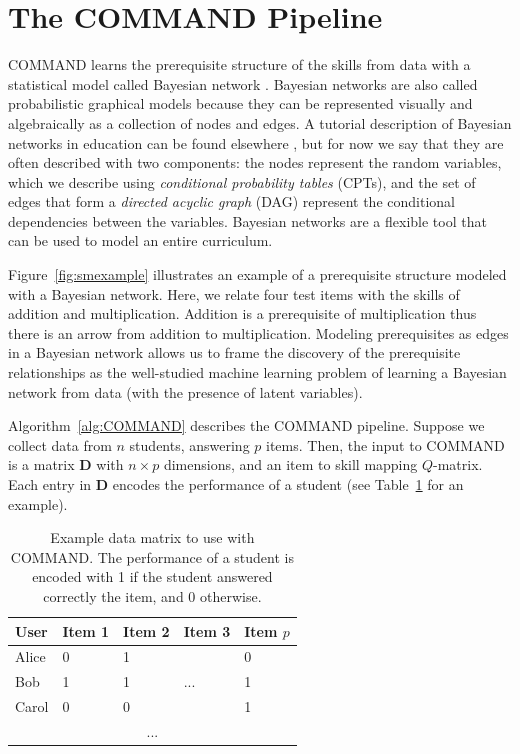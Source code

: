 \documentclass{edm_template}
\begin{document}
\section{The COMMAND Pipeline}
\label{sec:pre_pipeline}
COMMAND learns the prerequisite structure of the skills from data with a statistical model called Bayesian network \cite{pearl2000causality,spirtes2001causation}.
Bayesian networks are also called probabilistic graphical models  because they can  be represented visually and algebraically as a collection of nodes and edges.
A tutorial description of Bayesian networks in education can be found elsewhere \cite{almond2015bayesian}, 
but for now we say that they are often described with two components: 
the  nodes represent the random variables, which we describe using \textit{conditional probability tables} (CPTs),
and the set of edges that form a \textit{directed acyclic graph} (DAG) represent the conditional dependencies between the variables.
Bayesian networks are a flexible tool that can be used to model an entire curriculum.

Figure~\ref{fig:smexample} illustrates an example of a prerequisite structure modeled with a Bayesian network.
Here, we relate four test items with the skills of addition and multiplication.
Addition is a prerequisite of multiplication thus there is an arrow from addition to multiplication.
Modeling prerequisites as edges in a Bayesian network allows us to frame the discovery of the prerequisite relationships as the well-studied machine learning problem of
learning a Bayesian network from data (with the presence of latent variables).


Algorithm~\ref{alg:COMMAND} describes the COMMAND pipeline.
Suppose we collect data from  $n$ students, answering $p$ items.
Then, the input to COMMAND is a matrix $\mathbf{D}$ with $n \times p$ dimensions, and an item to skill mapping $Q$-matrix.
Each entry in $\mathbf{D}$ encodes the performance of a student (see Table~\ref{tbl:d-matrix} for an example).


\begin{table}[htb]%
	\centering
	\caption{Example data matrix to use with COMMAND.  The performance of a student is encoded with 1 if the student answered correctly the item, and 0 otherwise. \label{tbl:d-matrix}}
	\begin{tabular}{@{}lllll@{}}
		\toprule
		User  & Item 1 & Item 2 & Item 3 & Item $p$ \\ \midrule
		Alice & 0      & 1      &        & 0        \\
		Bob   & 1      & 1      & ...    & 1        \\
		Carol & 0      & 0      &        & 1        \\
		\multicolumn{5}{c}{...}                     \\ \bottomrule
	\end{tabular}
\end{table}
\end{document}
